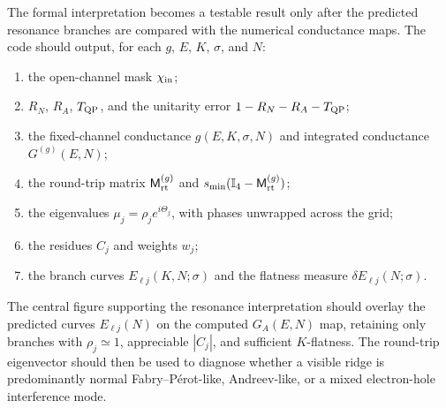 The formal interpretation becomes a testable result only after the predicted resonance branches are compared with the numerical conductance maps.  The code should output, for each $g$, $E$, $K$, $\sigma$, and $N$:
\begin{enumerate}[label=(\roman*)]
    \item the open-channel mask $\chi_{\rm in}$;
    \item $R_N$, $R_A$, $T_{\rm QP}$, and the unitarity error $1-R_N-R_A-T_{\rm QP}$;
    \item the fixed-channel conductance $g(E,K,\sigma,N)$ and integrated conductance $G^{(g)}(E,N)$;
    \item the round-trip matrix $\mathsf M_{\mathrm{rt}}^{(g)}$ and $s_{\min}(\mathbb I_4-\mathsf M_{\mathrm{rt}}^{(g)})$;
    \item the eigenvalues $\mu_j=\rho_j e^{i\Theta_j}$, with phases unwrapped across the grid;
    \item the residues $C_j$ and weights $w_j$;
    \item the branch curves $E_{\ell j}(K,N;\sigma)$ and the flatness measure $\delta E_{\ell j}(N;\sigma)$.
\end{enumerate}
The central figure supporting the resonance interpretation should overlay the predicted curves $E_{\ell j}(N)$ on the computed $G_A(E,N)$ map, retaining only branches with $\rho_j\simeq1$, appreciable $|C_j|$, and sufficient $K$-flatness.  The round-trip eigenvector should then be used to diagnose whether a visible ridge is predominantly normal Fabry--P\'erot-like, Andreev-like, or a mixed electron-hole interference mode.
